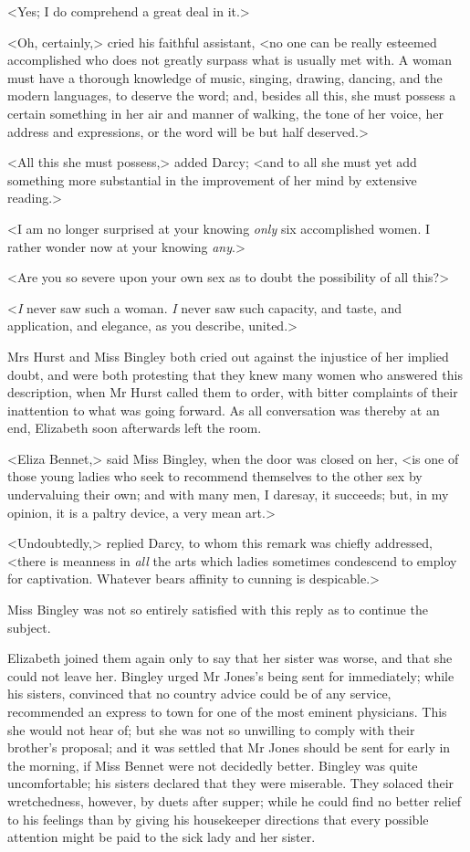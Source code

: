 <Yes; I do comprehend a great deal in it.>

<Oh, certainly,> cried his faithful assistant, <no one can be really esteemed accomplished who does not greatly surpass what is usually met with. A woman must have a thorough knowledge of music, singing, drawing, dancing, and the modern languages, to deserve the word; and, besides all this, she must possess a certain something in her air and manner of walking, the tone of her voice, her address and expressions, or the word will be but half deserved.>

<All this she must possess,> added Darcy; <and to all she must yet add something more substantial in the improvement of her mind by extensive reading.>

<I am no longer surprised at your knowing \textit{only} six accomplished women. I rather wonder now at your knowing \textit{any}.>

<Are you so severe upon your own sex as to doubt the possibility of all this?>

<\textit{I} never saw such a woman. \textit{I} never saw such capacity, and taste, and application, and elegance, as you describe, united.>

Mrs Hurst and Miss Bingley both cried out against the injustice of her implied doubt, and were both protesting that they knew many women who answered this description, when Mr Hurst called them to order, with bitter complaints of their inattention to what was going forward. As all conversation was thereby at an end, Elizabeth soon afterwards left the room.

<Eliza Bennet,> said Miss Bingley, when the door was closed on her, <is one of those young ladies who seek to recommend themselves to the other sex by undervaluing their own; and with many men, I daresay, it succeeds; but, in my opinion, it is a paltry device, a very mean art.>

<Undoubtedly,> replied Darcy, to whom this remark was chiefly addressed, <there is meanness in \textit{all} the arts which ladies sometimes condescend to employ for captivation. Whatever bears affinity to cunning is despicable.>

Miss Bingley was not so entirely satisfied with this reply as to continue the subject.

Elizabeth joined them again only to say that her sister was worse, and that she could not leave her. Bingley urged Mr Jones's being sent for immediately; while his sisters, convinced that no country advice could be of any service, recommended an express to town for one of the most eminent physicians. This she would not hear of; but she was not so unwilling to comply with their brother's proposal; and it was settled that Mr Jones should be sent for early in the morning, if Miss Bennet were not decidedly better. Bingley was quite uncomfortable; his sisters declared that they were miserable. They solaced their wretchedness, however, by duets after supper; while he could find no better relief to his feelings than by giving his housekeeper directions that every possible attention might be paid to the sick lady and her sister.